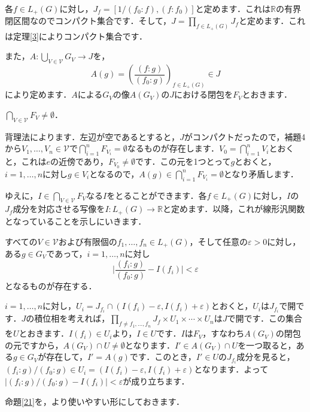 各$f \in L_{+}(G)$に対し，$J_{f}=[1/ ( f_0 \colon f ) , ( f \colon f_{0} )]$と定めます．これは$\mathbb{R}$の有界閉区間なのでコンパクト集合です．そして，$J=\prod_{f \in L_{+}(G)} J_f$と定めます．これは定理\ref{3}によりコンパクト集合です．

また，$A \colon \bigcup_{V \in \mathscr{V}}G_V \to J$を，
\[
A(g)=\left( \frac{( f \colon g )}{( f_0 \colon g )} \right)_{f \in L_{+}(G)} \in J
\]
により定めます．$A$による$G_V$の像$A(G_V)$の$J$における閉包を$F_V$とおきます．
\begin{yprop}\label{20}
$\bigcap_{V \in \mathscr{V}}F_V \neq \emptyset$．
\end{yprop}
\begin{Proof}
背理法によります．左辺が空であるとすると，$J$がコンパクトだったので，補題4から$V_1, \ldots , V_n \in \mathscr{V}$で$\bigcap_{i=1}^{n}F_{V_i}=\emptyset$なるものが存在します．$V_0=\bigcap_{i=1}^{n}V_i$とおくと，これは$e$の近傍であり，$F_{V_0} \neq \emptyset$です．この元を1つとって$g$とおくと，$i=1, \ldots , n$に対し$g \in V_i$となるので，$A(g) \in \bigcap_{i=1}^{n}F_{V_i}=\emptyset$となり矛盾します．　
\end{Proof}

ゆえに，$I \in \bigcap_{V \in \mathscr{V}}F_V$なる$I$をとることができます．各$f \in L_{+}(G)$に対し，$I$の$J_f$成分を対応させる写像を$I \colon L_{+}(G) \to \mathbb{R}$と定めます．以降，これが線形汎関数となっていることを示しにいきます．
\begin{yprop}\label{21}
すべての$V \in \mathscr{V}$および有限個の$f_1, \ldots , f_n \in L_{+}(G)$，そして任意の$\varepsilon > 0$に対し，ある$g \in G_V$であって，$i=1, \ldots , n$に対し
\[
\lvert \frac{(f_i \colon g )}{( f_0 \colon g )} -I(f_i) \lvert < \varepsilon
\]
となるものが存在する．
\end{yprop}
\begin{Proof}
$i=1, \ldots , n$に対し，$U_i=J_{f_i} \cap ( I(f_i)- \varepsilon, I(f_i)+\varepsilon )$とおくと，$U_i$は$J_{f_i}$で開です．$J$の積位相を考えれば，$\prod_{f \neq f_1, \ldots , f_n}J_f \times U_1 \times \cdots \times U_n$は$J$で開です．この集合を$U$とおきます．$I(f_i) \in U_i$より，$I \in U$です．$I$は$F_V$，すなわち$A(G_V)$の閉包の元ですから，$A(G_V) \cap U \neq \emptyset$となります．$I' \in A(G_V) \cap U$を一つ取ると，ある$g \in G_V$が存在して，$I'=A(g)$です．このとき，$I' \in U$の$J_{f_i}$成分を見ると，$(f_i \colon g ) / ( f_0 \colon g ) \in U_i = ( I(f_i)- \varepsilon, I(f_i)+\varepsilon )$となります．よって$|(f_i \colon g ) / ( f_0 \colon g ) -I(f_i) | < \varepsilon$が成り立ちます．
\end{Proof}
命題\ref{21}を，より使いやすい形にしておきます．


